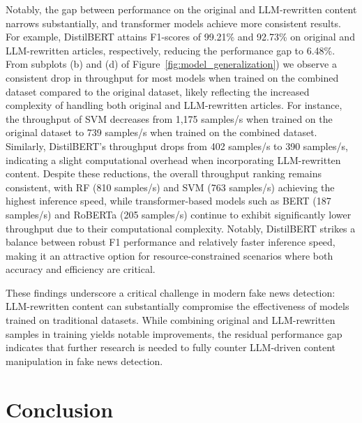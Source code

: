 \documentclass[runningheads]{llncs}
\begin{document}
Notably, the gap between performance on the original and LLM-rewritten content narrows substantially, and transformer models achieve more consistent results. For example, DistilBERT attains F1-scores of 99.21\% and 92.73\% on original and LLM-rewritten articles, respectively, reducing the performance gap to 6.48\%.
From subplots (b) and (d) of Figure~\ref{fig:model_generalization}) we observe a consistent drop in throughput for most models when trained on the combined dataset compared to the original dataset, likely reflecting the increased complexity of handling both original and LLM-rewritten articles. For instance, the throughput of SVM decreases from 1,175 samples/s when trained on the original dataset to 739 samples/s when trained on the combined dataset. Similarly, DistilBERT's throughput drops from 402 samples/s to 390 samples/s, indicating a slight computational overhead when incorporating LLM-rewritten content. Despite these reductions, the overall throughput ranking remains consistent, with RF (810 samples/s) and SVM (763 samples/s) achieving the highest inference speed, while transformer-based models such as BERT (187 samples/s) and RoBERTa (205 samples/s) continue to exhibit significantly lower throughput due to their computational complexity. Notably, DistilBERT strikes a balance between robust F1 performance and relatively faster inference speed, making it an attractive option for resource-constrained scenarios where both accuracy and efficiency are critical.

These findings underscore a critical challenge in modern fake news detection: LLM-rewritten content can substantially compromise the effectiveness of models trained on traditional datasets. While combining original and LLM-rewritten samples in training yields notable improvements, the residual performance gap indicates that further research is needed to fully counter LLM-driven content manipulation in fake news detection.

\section{Conclusion}
\label{sec:conclusion}
\end{document}
